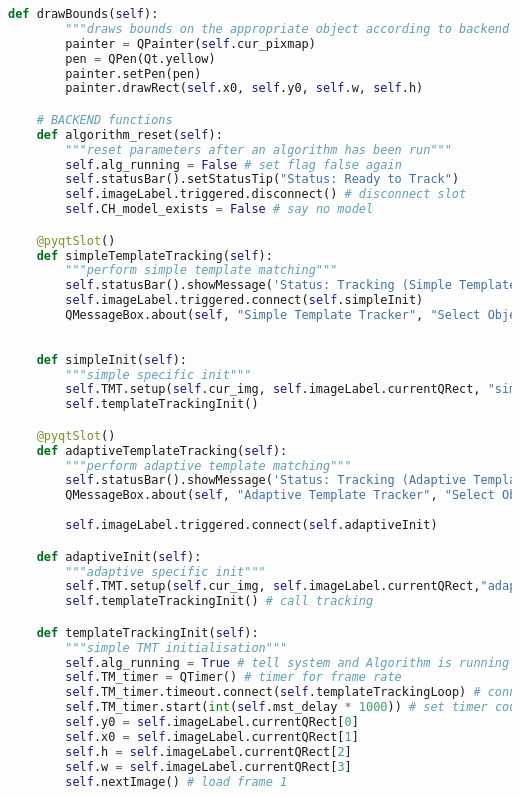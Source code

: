 \begin{lstlisting}[language=Python, caption={GUI Impementation Code}, captionpos=b, label={lst:gui}]
    def drawBounds(self):
        """draws bounds on the appropriate object according to backend coordinates"""
        painter = QPainter(self.cur_pixmap)
        pen = QPen(Qt.yellow)
        painter.setPen(pen)
        painter.drawRect(self.x0, self.y0, self.w, self.h)

    # BACKEND functions 
    def algorithm_reset(self):
        """reset parameters after an algorithm has been run"""
        self.alg_running = False # set flag false again
        self.statusBar().setStatusTip("Status: Ready to Track")
        self.imageLabel.triggered.disconnect() # disconnect slot
        self.CH_model_exists = False # say no model

    @pyqtSlot()
    def simpleTemplateTracking(self):
        """perform simple template matching"""
        self.statusBar().showMessage('Status: Tracking (Simple Template)') 
        self.imageLabel.triggered.connect(self.simpleInit)
        QMessageBox.about(self, "Simple Template Tracker", "Select Object to Track") 
            
    
    def simpleInit(self):
        """simple specific init"""
        self.TMT.setup(self.cur_img, self.imageLabel.currentQRect, "simple") # setup simple tracking
        self.templateTrackingInit()

    @pyqtSlot()
    def adaptiveTemplateTracking(self):
        """perform adaptive template matching"""    
        self.statusBar().showMessage('Status: Tracking (Adaptive Template)')
        QMessageBox.about(self, "Adaptive Template Tracker", "Select Object to Track") 
            
        self.imageLabel.triggered.connect(self.adaptiveInit) 

    def adaptiveInit(self):
        """adaptive specific init"""
        self.TMT.setup(self.cur_img, self.imageLabel.currentQRect,"adaptive") # setup adaptive tracking
        self.templateTrackingInit() # call tracking

    def templateTrackingInit(self):
        """simple TMT initialisation"""
        self.alg_running = True # tell system and Algorithm is running
        self.TM_timer = QTimer() # timer for frame rate
        self.TM_timer.timeout.connect(self.templateTrackingLoop) # connect timeouts to fetching next image
        self.TM_timer.start(int(self.mst_delay * 1000)) # set timer countdown rate        
        self.y0 = self.imageLabel.currentQRect[0]
        self.x0 = self.imageLabel.currentQRect[1]
        self.h = self.imageLabel.currentQRect[2]
        self.w = self.imageLabel.currentQRect[3]
        self.nextImage() # load frame 1


\end{lstlisting}
